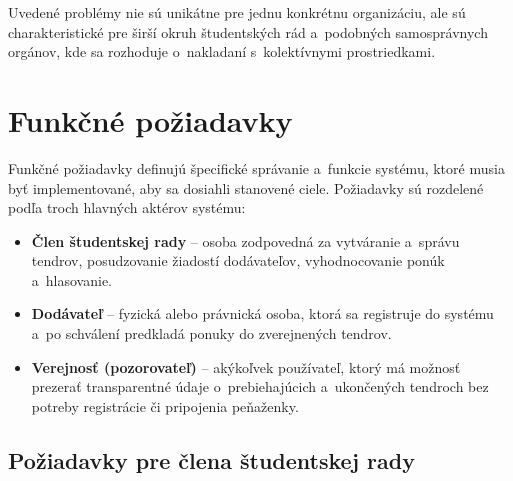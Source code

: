 Uvedené problémy nie sú unikátne pre jednu konkrétnu organizáciu,
ale sú charakteristické pre širší okruh študentských rád
a~podobných samosprávnych orgánov, kde sa rozhoduje o~nakladaní
s~kolektívnymi prostriedkami.

\section{Funkčné požiadavky}
\label{sec:functional_requirements}

Funkčné požiadavky definujú špecifické správanie a~funkcie systému,
ktoré musia byť implementované, aby sa dosiahli stanovené ciele.
Požiadavky sú rozdelené podľa troch hlavných aktérov systému:

\begin{itemize}
    \item \textbf{Člen študentskej rady} -- osoba zodpovedná za
    vytváranie a~správu tendrov, posudzovanie žiadostí dodávateľov,
    vyhodnocovanie ponúk a~hlasovanie.

    \item \textbf{Dodávateľ} -- fyzická alebo právnická osoba, ktorá
    sa registruje do systému a~po schválení predkladá ponuky do
    zverejnených tendrov.

    \item \textbf{Verejnosť (pozorovateľ)} -- akýkoľvek používateľ,
    ktorý má možnosť prezerať transparentné údaje o~prebiehajúcich
    a~ukončených tendroch bez potreby registrácie či pripojenia
    peňaženky.
\end{itemize}

\subsection{Požiadavky pre člena študentskej rady}
\label{subsec:fr_council}

